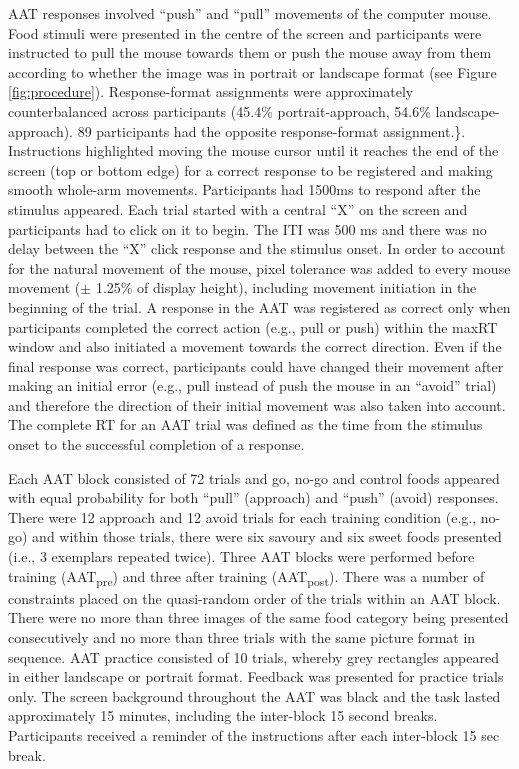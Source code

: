\documentclass[man,floatsintext]{apa6}
\begin{document}
AAT responses involved \enquote{push} and \enquote{pull} movements of the computer mouse. Food stimuli were presented in the centre of the screen and participants were instructed to pull the mouse towards them or push the mouse away from them according to whether the image was in portrait or landscape format (see Figure \ref{fig:procedure}). Response-format assignments were approximately counterbalanced across participants (45.4\% portrait-approach, 54.6\% landscape-approach). 89 participants had the opposite response-format assignment.\}. Instructions highlighted moving the mouse cursor until it reaches the end of the screen (top or bottom edge) for a correct response to be registered and making smooth whole-arm movements. Participants had 1500ms to respond after the stimulus appeared. Each trial started with a central \enquote{X} on the screen and participants had to click on it to begin. The ITI was 500 ms and there was no delay between the \enquote{X} click response and the stimulus onset. In order to account for the natural movement of the mouse, pixel tolerance was added to every mouse movement (\(\pm\) 1.25\% of display height), including movement initiation in the beginning of the trial. A response in the AAT was registered as correct only when participants completed the correct action (e.g., pull or push) within the maxRT window and also initiated a movement towards the correct direction. Even if the final response was correct, participants could have changed their movement after making an initial error (e.g., pull instead of push the mouse in an \enquote{avoid} trial) and therefore the direction of their initial movement was also taken into account. The complete RT for an AAT trial was defined as the time from the stimulus onset to the successful completion of a response.

\par

Each AAT block consisted of 72 trials and go, no-go and control foods appeared with equal probability for both \enquote{pull} (approach) and \enquote{push} (avoid) responses. There were 12 approach and 12 avoid trials for each training condition (e.g., no-go) and within those trials, there were six savoury and six sweet foods presented (i.e., 3 exemplars repeated twice). Three AAT blocks were performed before training (AAT\textsubscript{pre}) and three after training (AAT\textsubscript{post}). There was a number of constraints placed on the quasi-random order of the trials within an AAT block. There were no more than three images of the same food category being presented consecutively and no more than three trials with the same picture format in sequence. AAT practice consisted of 10 trials, whereby grey rectangles appeared in either landscape or portrait format. Feedback was presented for practice trials only. The screen background throughout the AAT was black and the task lasted approximately 15 minutes, including the inter-block 15 second breaks. Participants received a reminder of the instructions after each inter-block 15 sec break.
\end{document}
